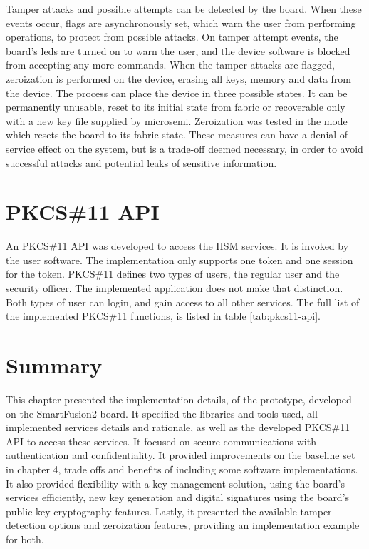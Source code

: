 Tamper attacks and possible attempts can be detected by the board. When these events occur, flags are asynchronously set, which warn the user from performing operations, to protect from possible attacks.
On tamper attempt events, the board's leds are turned on to warn the user, and the device software is blocked from accepting any more commands.
When the tamper attacks are flagged, zeroization is performed on the device, erasing all keys, memory and data from the device.
The process can place the device in three possible states. It can be permanently unusable, reset to its initial state from fabric or recoverable only with a new key file supplied by microsemi. Zeroization was tested in the mode which resets the board to its fabric state.
These measures can have a denial-of-service effect on the system, but is a trade-off deemed necessary, in order to avoid successful attacks and potential leaks of sensitive information.

\section{PKCS\#11 API}\label{chap:implementation:app:pkcs}

An PKCS\#11 API was developed to access the HSM services. It is invoked by the user software.
The implementation only supports one token and one session for the token.
PKCS\#11 defines two types of users, the regular user and the security officer. The implemented application does not make that distinction. Both types of user can login, and gain access to all other services.
The full list of the implemented PKCS\#11 functions, is listed in table \ref{tab:pkcs11-api}.

\section*{Summary}\label{chap:implementation:summary}

This chapter presented the implementation details, of the prototype, developed on the SmartFusion2 board. It specified the libraries and tools used, all implemented services details and rationale, as well as the developed PKCS\#11 API to access these services. It focused on secure communications with authentication and confidentiality. It provided improvements on the baseline set in chapter 4, trade offs and benefits of including some software implementations. It also provided flexibility with a key management solution, using the board's services efficiently, new key generation and digital signatures using the board's public-key cryptography features. Lastly, it presented the available tamper detection options and zeroization features, providing an implementation example for both.


